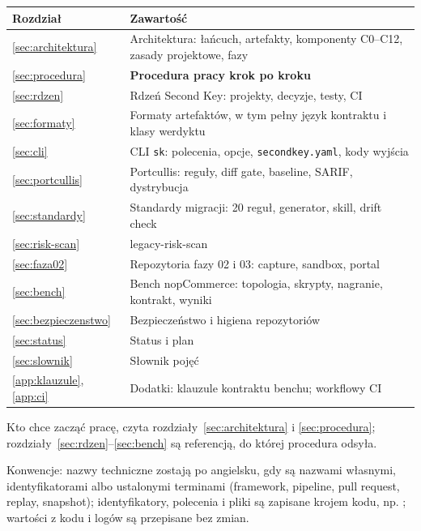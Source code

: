 \begin{tabularx}{\linewidth}{@{}p{1.9cm} X@{}}
\toprule
Rozdział & Zawartość \\
\midrule
\ref{sec:architektura} & Architektura: łańcuch, artefakty, komponenty C0--C12, zasady projektowe, fazy \\
\ref{sec:procedura} & \textbf{Procedura pracy krok po kroku} \\
\ref{sec:rdzen} & Rdzeń Second Key: projekty, decyzje, testy, CI \\
\ref{sec:formaty} & Formaty artefaktów, w tym pełny język kontraktu i klasy werdyktu \\
\ref{sec:cli} & CLI \texttt{sk}: polecenia, opcje, \texttt{secondkey.yaml}, kody wyjścia \\
\ref{sec:portcullis} & Portcullis: reguły, diff gate, baseline, SARIF, dystrybucja \\
\ref{sec:standardy} & Standardy migracji: 20 reguł, generator, skill, drift check \\
\ref{sec:risk-scan} & legacy-risk-scan \\
\ref{sec:faza02} & Repozytoria fazy 02 i 03: capture, sandbox, portal \\
\ref{sec:bench} & Bench nopCommerce: topologia, skrypty, nagranie, kontrakt, wyniki \\
\ref{sec:bezpieczenstwo} & Bezpieczeństwo i higiena repozytoriów \\
\ref{sec:status} & Status i plan \\
\ref{sec:slownik} & Słownik pojęć \\
\ref{app:klauzule}, \ref{app:ci} & Dodatki: klauzule kontraktu benchu; workflowy CI \\
\bottomrule
\end{tabularx}

Kto chce zacząć pracę, czyta rozdziały~\ref{sec:architektura} i \ref{sec:procedura};
rozdziały~\ref{sec:rdzen}--\ref{sec:bench} są referencją, do której procedura odsyła.

Konwencje: nazwy techniczne zostają po angielsku, gdy są nazwami własnymi,
identyfikatorami albo ustalonymi terminami (framework, pipeline, pull request, replay,
snapshot); identyfikatory, polecenia i pliki są zapisane krojem kodu, np.
; wartości z kodu i logów są przepisane bez zmian.

